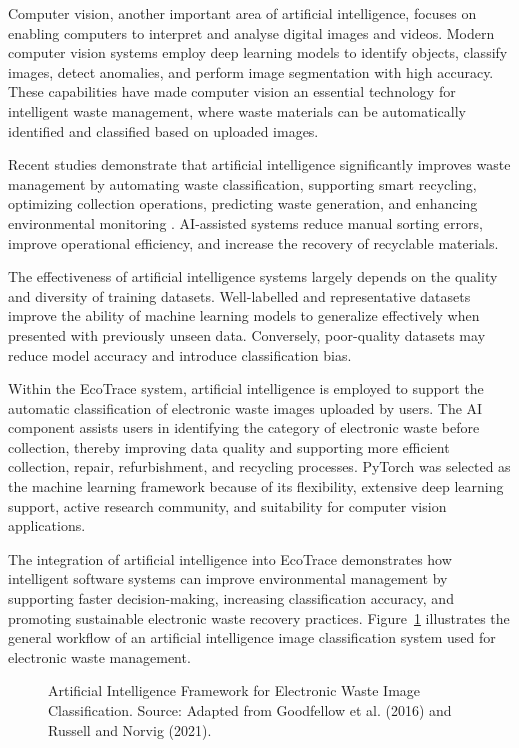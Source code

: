 Computer vision, another important area of artificial intelligence, focuses on
enabling computers to interpret and analyse digital images and videos. Modern
computer vision systems employ deep learning models to identify objects, classify
images, detect anomalies, and perform image segmentation with high accuracy.
These capabilities have made computer vision an essential technology for
intelligent waste management, where waste materials can be automatically
identified and classified based on uploaded images.

Recent studies demonstrate that artificial intelligence significantly improves
waste management by automating waste classification, supporting smart
recycling, optimizing collection operations, predicting waste generation, and
enhancing environmental monitoring \citep{abdallah2022,sharma2023}. AI-assisted
systems reduce manual sorting errors, improve operational efficiency, and
increase the recovery of recyclable materials.

The effectiveness of artificial intelligence systems largely depends on the
quality and diversity of training datasets. Well-labelled and representative
datasets improve the ability of machine learning models to generalize effectively
when presented with previously unseen data. Conversely, poor-quality datasets
may reduce model accuracy and introduce classification bias.

Within the EcoTrace system, artificial intelligence is employed to support the
automatic classification of electronic waste images uploaded by users. The AI
component assists users in identifying the category of electronic waste before
collection, thereby improving data quality and supporting more efficient
collection, repair, refurbishment, and recycling processes. PyTorch was selected as
the machine learning framework because of its flexibility, extensive deep learning
support, active research community, and suitability for computer vision
applications.

The integration of artificial intelligence into EcoTrace demonstrates how
intelligent software systems can improve environmental management by
supporting faster decision-making, increasing classification accuracy, and
promoting sustainable electronic waste recovery practices. Figure~\ref{fig:ai-framework}
illustrates the general workflow of an artificial intelligence image classification
system used for electronic waste management.

\begin{figure}[H]
  \centering
  \caption{Artificial Intelligence Framework for Electronic Waste Image Classification. Source: Adapted from Goodfellow et al. (2016) and Russell and Norvig (2021).}
  \label{fig:ai-framework}
\end{figure}


